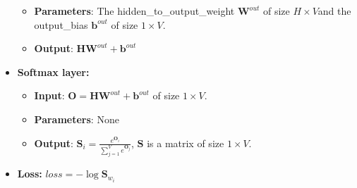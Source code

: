 \documentclass[twoside]{article}
\begin{document}
\begin{itemize}
\begin{itemize}
	\item \textbf{Parameters}: The hidden\_to\_output\_weight $\bm{W}^{out}$ of size $H\times V$and the output\_bias $\bm{b}^{out}$ of size $1\times V$.
	\item \textbf{Output}: $\bm{HW}^{out}+\bm{b}^{out}$
	\end{itemize}
\item \textbf{Softmax layer:}
	\begin{itemize}
	\item \textbf{Input}: $\bm{O} = \bm{HW}^{out}+\bm{b}^{out}$ of size $1\times V$.
	\item \textbf{Parameters}: None
	\item \textbf{Output}: $\bm{S}_i = \frac{e^{\bm{O}_i}}{\sum_{j=1}^{V}e^{\bm{O}_j}}$, $\bm{S}$ is a matrix of size $1\times V$.
	\end{itemize}
\item \textbf{Loss:} $loss= -\log{\bm{S}_{w_i}}$
\end{itemize}
\end{document}
